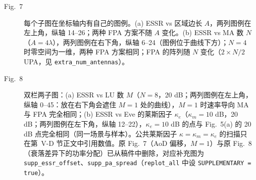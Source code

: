 \documentclass[11pt,a4paper]{ctexart}
\newcommand{\code}[1]{\texttt{#1}}
\begin{document}
\begin{description}
\item[Fig.~7] 每个子图在坐标轴内有自己的图例。(a) ESSR vs 区域边长 $A$，两列图例在左上角，纵轴 14--26；两种 FPA 方案不随 $A$ 变化。(b) ESSR vs MA 数 $N$（$A=4\lambda$），两列图例在右下角，纵轴 6--24（图例位于曲线下方）；$N=4$ 时零空间为一维，两种 FPA 方案相同；FPA 的阵列随 $N$ 变化（$2\times N/2$ UPA，见 \code{extra\_num\_antennas}）。
\item[Fig.~8] 双栏两子图：(a) ESSR vs LU 数 $M$（$N=8$，20 dB；两列图例在左上角，纵轴 0--45：放在右下角会遮住 $M=1$ 处的曲线），$M=1$ 时速率导向 MA 与 FPA 完全相同；(b) ESSR vs Eve 的莱斯因子 $\kappa_e$（$\kappa_m=10$ dB，20 dB；两列图例在左下角，纵轴 12--22），$\kappa_e=10$ dB 的点与 Fig.~5(a) 的 20 dB 点完全相同（同一场景与样本）。公共莱斯因子 $\kappa=\kappa_m=\kappa_e$ 的扫描只在第~V-D 节正文中引用数值。原 Fig.~7（AoD 偏移，$M=1$）与原 Fig.~8（衰落差异下的功率分配）已从稿件中删除，对应补充图为 \code{supp\_essr\_offset}、\code{supp\_pa\_spread}（\code{replot\_all} 中设 \code{SUPPLEMENTARY = true}）。
\end{description}

\end{document}
